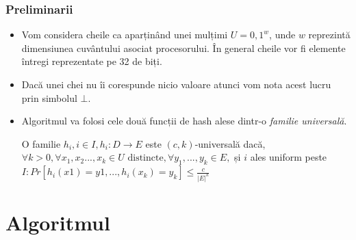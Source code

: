\documentclass{beamer}
\begin{document}
\begin{frame}
\frametitle{Preliminarii}
\begin{itemize}
\item Vom considera cheile ca aparținând unei mulțimi $U = {0,1}^w$, unde $w$ reprezintă dimensiunea cuvântului asociat procesorului. În general cheile vor fi elemente întregi reprezentate pe 32 de biți.
\item Dacă unei chei nu îi corespunde nicio valoare atunci vom nota acest lucru prin simbolul $\bot$.
\item Algoritmul va folosi cele două funcții de hash alese dintr-o \textit{familie universală}.
\begin{definition}
O familie  $h_i, i \in I, h_i:D \to E$  este $(c,k)$-universală dacă, $\forall k > 0, \forall x_1, x_2 ..., x_k \in U \text{ distincte}, \forall y_1, ..., y_k \in E,$ și $i$ ales uniform peste $I: Pr[h_i(x1) = y1, ..., h_i(x_k) = y_k] \leq \frac{c}{|E|^k}$
\end{definition}
\end{itemize}

\end{frame}
\section{Algoritmul}
\end{document}
